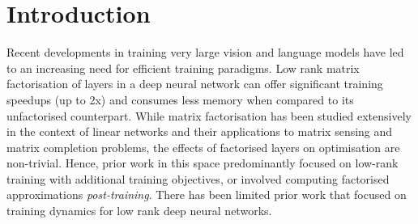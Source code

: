 \documentclass{article}
\begin{document}
\printAffiliationsAndNotice{\icmlEqualContribution}

\begin{abstract}

Training deep neural networks in low rank, i.e. with factorised layers, is of particular interest to the community: it offers efficiency over unfactorised training in terms of both memory consumption and training time. Prior work has focused on low rank approximations of pre-trained networks and training in low rank space with additional objectives, offering various ad hoc explanations for chosen practice. We analyse techniques that work well in practice, and through extensive ablations on models such as GPT2 we provide evidence falsifying common beliefs in the field, hinting in the process at exciting research opportunities that still need answering. 


\end{abstract}


\section{Introduction}

Recent developments in training very large vision and language models \cite{gpt3,switchtransformer, ViT} have led to an increasing need for efficient training paradigms. Low rank matrix factorisation of layers in a deep neural network can offer significant training speedups (up to 2x) and consumes less memory when compared to its unfactorised counterpart.
While matrix factorisation has been studied extensively in the context of linear networks and their applications to matrix sensing and matrix completion problems, the effects of factorised layers on optimisation are non-trivial. Hence, prior work in this space predominantly focused on low-rank training with additional training objectives, or involved computing factorised approximations \emph{post-training}. There has been limited prior work that focused on training dynamics for low rank deep neural networks.
\end{document}

